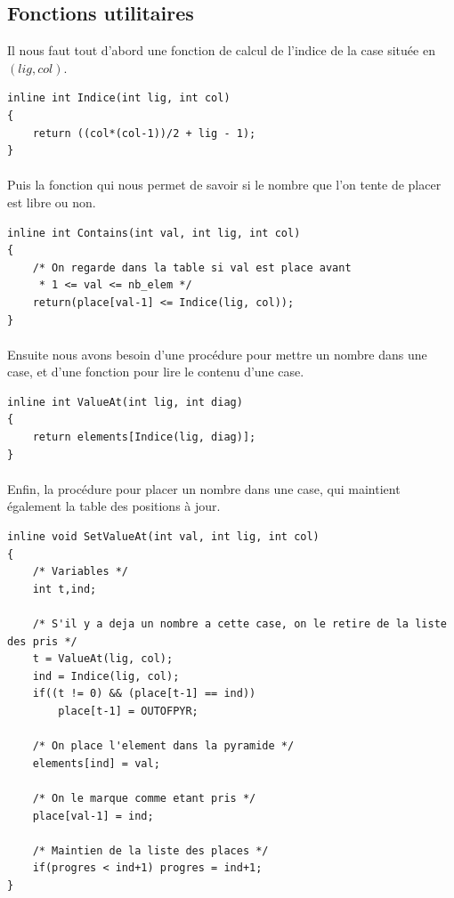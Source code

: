 \documentclass[10pt]{article}%
\begin{document}
\subsection*{Fonctions utilitaires}
  Il nous faut tout d'abord une fonction de calcul de l'indice de la case située en $(lig, col)$.
  \begin{verbatim}
inline int Indice(int lig, int col)
{
    return ((col*(col-1))/2 + lig - 1);
}
  \end{verbatim}

\paragraph*{}
  Puis la fonction qui nous permet de savoir si le nombre que l'on tente de placer est libre ou non.
  \begin{verbatim}
inline int Contains(int val, int lig, int col)
{
    /* On regarde dans la table si val est place avant
     * 1 <= val <= nb_elem */
    return(place[val-1] <= Indice(lig, col));
}
  \end{verbatim}

\paragraph*{}
  Ensuite nous avons besoin d'une procédure pour mettre un nombre dans une case, et d'une fonction
  pour lire le contenu d'une case.
  \begin{verbatim}
inline int ValueAt(int lig, int diag)
{
    return elements[Indice(lig, diag)];
}
  \end{verbatim}

\paragraph*{}
  Enfin, la procédure pour placer un nombre dans une case, qui maintient également la table
  des positions à jour.
  \begin{verbatim}
inline void SetValueAt(int val, int lig, int col)
{
    /* Variables */
    int t,ind;

    /* S'il y a deja un nombre a cette case, on le retire de la liste des pris */
    t = ValueAt(lig, col);
    ind = Indice(lig, col);
    if((t != 0) && (place[t-1] == ind))
        place[t-1] = OUTOFPYR;

    /* On place l'element dans la pyramide */
    elements[ind] = val;

    /* On le marque comme etant pris */
    place[val-1] = ind;

    /* Maintien de la liste des places */
    if(progres < ind+1) progres = ind+1;
}
  \end{verbatim}
\end{document}
